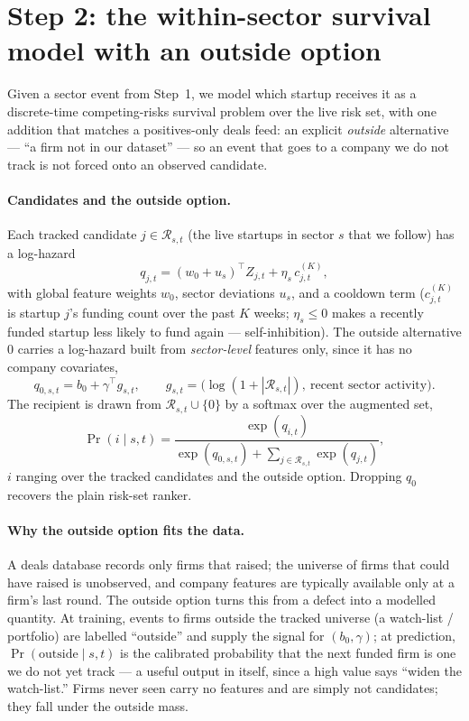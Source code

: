 \documentclass[11pt]{article}
\newcommand{\Rset}{\mathcal{R}}
\begin{document}
\section{Step 2: the within-sector survival model with an outside option}
\label{sec:step2}

Given a sector event from Step~1, we model which startup receives it as a discrete-time
competing-risks survival problem over the live risk set, with one addition that matches a
positives-only deals feed: an explicit \emph{outside} alternative --- ``a firm not in our
dataset'' --- so an event that goes to a company we do not track is not forced onto an
observed candidate.

\paragraph{Candidates and the outside option.} Each tracked candidate $j\in\Rset_{s,t}$
(the live startups in sector $s$ that we follow) has a log-hazard
\begin{equation}
q_{j,t}=(w_0+u_s)^\top Z_{j,t}+\eta_s\,c^{(K)}_{j,t},
\label{eq:score}
\end{equation}
with global feature weights $w_0$, sector deviations $u_s$, and a cooldown term
($c^{(K)}_{j,t}$ is startup $j$'s funding count over the past $K$ weeks; $\eta_s\le0$
makes a recently funded startup less likely to fund again --- self-inhibition). The
outside alternative $0$ carries a log-hazard built from \emph{sector-level} features only,
since it has no company covariates,
\begin{equation}
q_{0,s,t}=b_0+\gamma^\top g_{s,t},\qquad
g_{s,t}=\big(\log(1+|\Rset_{s,t}|),\ \text{recent sector activity}\big).
\label{eq:outside}
\end{equation}
The recipient is drawn from $\Rset_{s,t}\cup\{0\}$ by a softmax over the augmented set,
\begin{equation}
\Pr(i\mid s,t)=\frac{\exp(q_{i,t})}{\exp(q_{0,s,t})+\sum_{j\in\Rset_{s,t}}\exp(q_{j,t})},
\label{eq:softmax}
\end{equation}
$i$ ranging over the tracked candidates and the outside option. Dropping $q_0$ recovers
the plain risk-set ranker.

\paragraph{Why the outside option fits the data.} A deals database records only firms that
raised; the universe of firms that could have raised is unobserved, and company features
are typically available only at a firm's last round. The outside option turns this from a
defect into a modelled quantity. At training, events to firms outside the tracked universe
(a watch-list / portfolio) are labelled ``outside'' and supply the signal for
$(b_0,\gamma)$; at prediction, $\Pr(\text{outside}\mid s,t)$ is the calibrated probability
that the next funded firm is one we do not yet track --- a useful output in itself, since a
high value says ``widen the watch-list.'' Firms never seen carry no features and are
simply not candidates; they fall under the outside mass.
\end{document}
